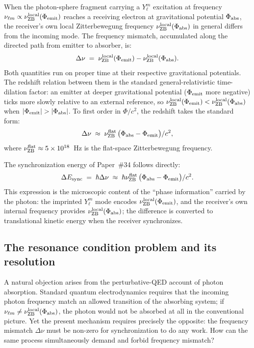 \documentclass[%
 reprint, amsmath,amssymb, aps, prb, ]{revtex4-2}
\numberwithin{equation}{section}
\newcommand{\nuZBl}{\nu_{\text{ZB}}^{\rm local}}
\newcommand{\nuZBf}{\nu_{\text{ZB}}^{\rm flat}}
\begin{document}
When the photon-sphere fragment carrying a $Y_\ell^m$ excitation at frequency $\nu_{\ell m} \propto \nuZBl(\Phi_{\rm emit})$ reaches a receiving electron at gravitational potential $\Phi_{\rm abs}$, the receiver's own local Zitterbewegung frequency $\nuZBl(\Phi_{\rm abs})$ in general differs from the incoming mode. The frequency mismatch, accumulated along the directed path from emitter to absorber, is:
\begin{equation}
\Delta\nu \;=\; \nuZBl(\Phi_{\rm emit}) - \nuZBl(\Phi_{\rm abs}).
\label{eq:mismatch}
\end{equation}
Both quantities run on proper time at their respective gravitational potentials. The redshift relation between them is the standard general-relativistic time-dilation factor: an emitter at deeper gravitational potential ($\Phi_{\rm emit}$ more negative) ticks more slowly relative to an external reference, so $\nuZBl(\Phi_{\rm emit}) < \nuZBl(\Phi_{\rm abs})$ when $|\Phi_{\rm emit}| > |\Phi_{\rm abs}|$. To first order in $\Phi/c^2$, the redshift takes the standard form:
\begin{equation}
\Delta\nu \;\approx\; \nuZBf\,\bigl(\Phi_{\rm abs} - \Phi_{\rm emit}\bigr)/c^2,
\label{eq:redshift}
\end{equation}
where $\nuZBf \approx 5\times 10^{18}$~Hz is the flat-space Zitterbewegung frequency.

The synchronization energy of Paper~\#34 follows directly:
\begin{equation}
\Delta E_{\rm sync} \;=\; \hbar\Delta\nu \;\approx\; \hbar\nuZBf\,\bigl(\Phi_{\rm abs} - \Phi_{\rm emit}\bigr)/c^2.
\label{eq:sync_energy}
\end{equation}
This expression is the microscopic content of the ``phase information'' carried by the photon: the imprinted $Y_\ell^m$ mode encodes $\nuZBl(\Phi_{\rm emit})$, and the receiver's own internal frequency provides $\nuZBl(\Phi_{\rm abs})$; the difference is converted to translational kinetic energy when the receiver synchronizes.

\subsection{The resonance condition problem and its resolution}

A natural objection arises from the perturbative-QED account of photon absorption. Standard quantum electrodynamics requires that the incoming photon frequency match an allowed transition of the absorbing system; if $\nu_{\ell m} \neq \nuZBl(\Phi_{\rm abs})$, the photon would not be absorbed at all in the conventional picture. Yet the present mechanism requires precisely the opposite: the frequency mismatch $\Delta\nu$ must be non-zero for synchronization to do any work. How can the same process simultaneously demand and forbid frequency mismatch?
\end{document}
